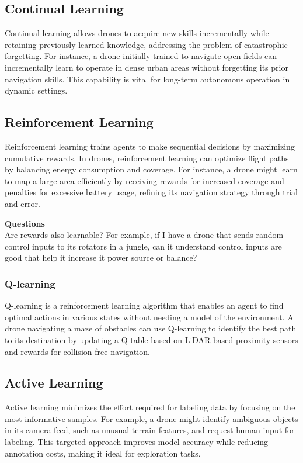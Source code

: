 \subsection{Continual Learning}
Continual learning allows drones to acquire new skills incrementally while retaining previously learned knowledge, addressing the problem of catastrophic forgetting. For instance, a drone initially trained to navigate open fields can incrementally learn to operate in dense urban areas without forgetting its prior navigation skills. This capability is vital for long-term autonomous operation in dynamic settings. \cite{parisi-2019-continual-learning}

\subsection{Reinforcement Learning}
Reinforcement learning trains agents to make sequential decisions by maximizing cumulative rewards. In drones, reinforcement learning can optimize flight paths by balancing energy consumption and coverage. For instance, a drone might learn to map a large area efficiently by receiving rewards for increased coverage and penalties for excessive battery usage, refining its navigation strategy through trial and error. \cite{sutton-2018-reinforcement-learning}

\textbf{Questions}
\\
Are rewards also learnable? For example, if I have a drone that sends random control inputs to its rotators in a jungle, can it understand control inputs are good that help it increase it power source or balance?

\subsubsection{Q-learning}
Q-learning is a reinforcement learning algorithm that enables an agent to find optimal actions in various states without needing a model of the environment. A drone navigating a maze of obstacles can use Q-learning to identify the best path to its destination by updating a Q-table based on LiDAR-based proximity sensors and rewards for collision-free navigation.

\subsection{Active Learning}
Active learning minimizes the effort required for labeling data by focusing on the most informative samples. For example, a drone might identify ambiguous objects in its camera feed, such as unusual terrain features, and request human input for labeling. This targeted approach improves model accuracy while reducing annotation costs, making it ideal for exploration tasks. \cite{settles-2009-active-learning}

